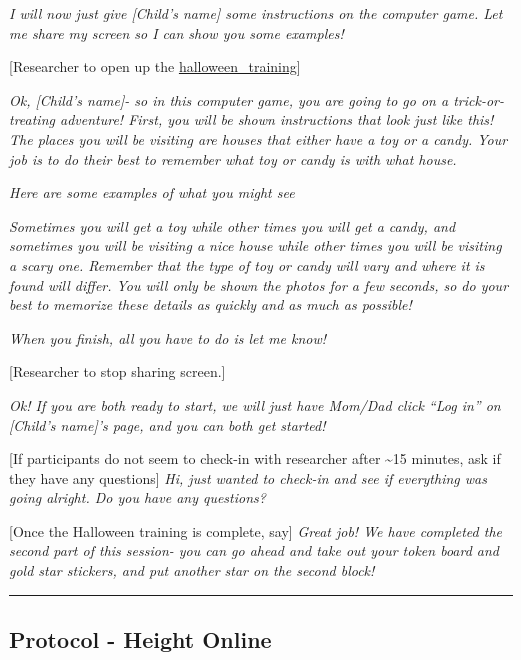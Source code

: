 \documentclass[]{book}
\begin{document}
\emph{I will now just give {[}Child's name{]} some instructions on the computer game. Let me share my screen so I can show you some examples!}

{[}Researcher to open up the \href{https://ucla.app.box.com/file/709481066655}{halloween\_training}{]}

\emph{Ok, {[}Child's name{]}- so in this computer game, you are going to go on a trick-or-treating adventure! First, you will be shown instructions that look just like this! The places you will be visiting are houses that either have a toy or a candy. Your job is to do their best to remember what toy or candy is with what house.}

\emph{Here are some examples of what you might see}

\emph{Sometimes you will get a toy while other times you will get a candy, and sometimes you will be visiting a nice house while other times you will be visiting a scary one. Remember that the type of toy or candy will vary and where it is found will differ. You will only be shown the photos for a few seconds, so do your best to memorize these details as quickly and as much as possible!}

\emph{When you finish, all you have to do is let me know!}

{[}Researcher to stop sharing screen.{]}

\emph{Ok! If you are both ready to start, we will just have Mom/Dad click ``Log in'' on {[}Child's name{]}'s page, and you can both get started!}

{[}If participants do not seem to check-in with researcher after \textasciitilde{}15 minutes, ask if they have any questions{]} \emph{Hi, just wanted to check-in and see if everything was going alright. Do you have any questions?}

{[}Once the Halloween training is complete, say{]} \emph{Great job! We have completed the second part of this session- you can go ahead and take out your token board and gold star stickers, and put another star on the second block!}

\begin{center}\rule{0.5\linewidth}{0.5pt}\end{center}

\hypertarget{protocol---height-online}{%
\subsection{Protocol - Height Online}\label{protocol---height-online}}
\end{document}
